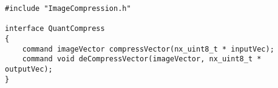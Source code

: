 \documentclass{article}
\begin{document}
\begin{verbatim}
#include "ImageCompression.h"

interface QuantCompress
{
	command imageVector compressVector(nx_uint8_t * inputVec);
	command void deCompressVector(imageVector, nx_uint8_t * outputVec);
}
\end{verbatim}
\end{document}
